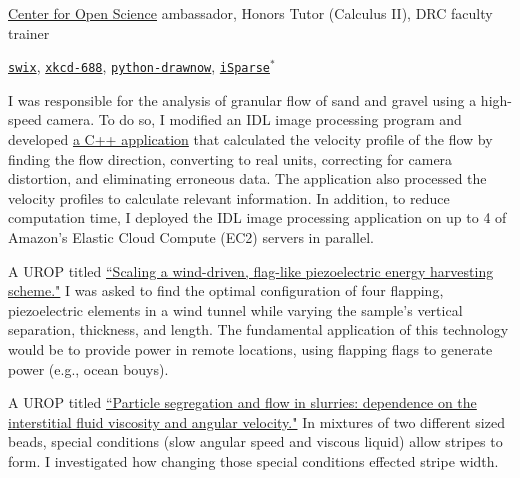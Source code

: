     \href{https://cos.io}{Center for Open Science} ambassador,
    Honors Tutor (Calculus II),
    DRC faculty trainer

\hspace{0.2em}
    \texttt{\href{\swix}{swix}},
    \texttt{\href{\xkcd}{xkcd-688}},
    \texttt{\href{\drawnow}{python-drawnow}},
    \texttt{\href{\isparse}{iSparse$^*$}}


\pagebreak %

    I was responsible for the analysis of granular flow of sand and gravel using a high-speed camera. To do so, I modified an IDL image processing program and developed \href{\granFlowGithub}{a C++ application} that calculated the velocity profile of the flow by finding the flow direction, converting to real units, correcting for camera distortion, and eliminating erroneous data. The application also processed the velocity profiles to calculate relevant information. In addition, to reduce computation time, I deployed the IDL image processing application on up to 4 of Amazon's Elastic Cloud Compute (EC2) servers in parallel.

    A UROP  titled \href{\robbinsReport} {``Scaling a wind-driven, flag-like piezoelectric energy harvesting scheme."} I was asked to  find the optimal configuration of four flapping, piezoelectric elements in a wind tunnel while varying the sample's vertical separation, thickness, and length. The fundamental application of this technology would be to provide power in remote locations, using flapping flags to generate power (e.g., ocean bouys).

    A UROP titled \href{\hillReport}{``Particle segregation and flow in slurries: dependence on the interstitial fluid viscosity and angular velocity."} In mixtures of two different sized beads, special conditions (slow angular speed and viscous liquid) allow stripes to form. I investigated how changing those special conditions effected stripe width.


